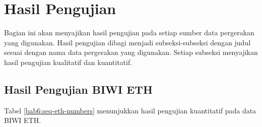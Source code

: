 \section{Hasil Pengujian}
\label{sec:result}

Bagian ini akan menyajikan hasil pengujian pada setiap sumber data pergerakan yang digunakan. Hasil pengujian dibagi menjadi subseksi-subseksi dengan judul sesuai dengan nama data pergerakan yang digunakan. Setiap subseksi menyajikan hasil pengujian kualitatif dan kuantitatif.

\subsection{Hasil Pengujian BIWI ETH}
\label{subsec:eth-result}

Tabel \ref{bab6:seq-eth-numbers} menunjukkan hasil pengujian kuantitatif pada data BIWI ETH.

